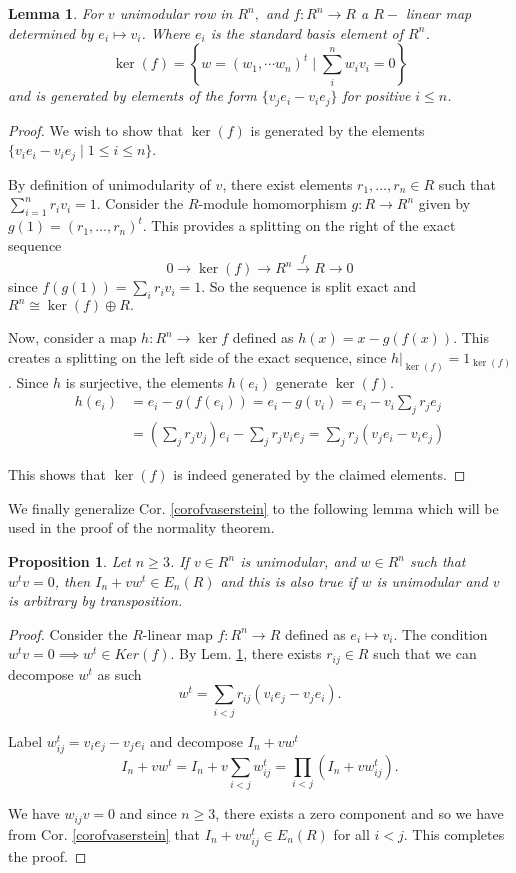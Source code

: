 \documentclass[12pt]{article}
\numberwithin{equation}{section}
\newcounter{dummy} \numberwithin{dummy}{section}
\newtheorem{lemma}[dummy]{Lemma}
\newtheorem{proposition}[dummy]{Proposition}
\begin{document}
		\begin{lemma}\label{kernelf}
			For $v$ unimodular row in $R^n,$ and $f: R^n \to R$ a $R-$ linear map determined by $e_i \mapsto v_i $. Where $e_i $ is the standard basis element of $R^n$.
			\[ \ker (f) =\left\{w=(w_1,\cdots w_n)^t \mid \sum_i^n w_i v_i =0\right\} \] and is generated by elements of the form \( \{ v_j e_i - v_i e_j \} \) for positive $i \leq n$.
			\end{lemma}
		\begin{proof}
			We wish to show that $\ker(f)$ is generated by the elements $\{v_ie_i - v_ie_j \mid 1 \leq i \leq n\}$.
			
			By definition of unimodularity of $v$, there exist elements $r_1, \ldots, r_n \in R$ such that $\sum_{i=1}^n r_iv_i = 1$. Consider the 
			$R$-module homomorphism $g: R \to R^n$ given by $g(1) = (r_1, \ldots, r_n)^t$. This provides a splitting 
			on the right of the exact sequence \[ 0 \to \ker (f ) \to R^n \xrightarrow{f} R \to 0 \] since $f(g(1))=\sum_i r_iv_i = 1$. So the sequence is split exact and $R^n \cong \ker (f) \oplus R.$
			
			Now, consider a map $h:R^n \to \ker f$ defined as  $h(x)=x - g(f(x))$. This creates a splitting on the left side of the 
			exact sequence, since  $h|_{\ker(f)} = 1_{\ker(f)}$. Since $h$ is surjective, the 
			elements $h(e_i)$ generate $\ker(f)$.
			\begin{align*}
				h(e_i) &= e_i - g(f(e_i)) = e_i - g(v_i) = e_i - v_i \sum_j r_je_j\\
				&= (\sum_j r_jv_j)e_i - \sum_j r_jv_ie_j = \sum_j r_j(v_je_i - v_ie_j)
			\end{align*}
			
			This shows that $\ker(f)$ is indeed generated by the claimed elements.
		\end{proof}
		
		We finally generalize Cor. \ref{corofvaserstein} to the following lemma which will be used in the proof of the normality theorem.
		\begin{proposition}\label{finalpropfornormality}
			Let $n \geq 3$. If $v \in R^n$ is unimodular, and $w \in R^n$ such that $w^tv = 0$, then $I_n + vw^t \in E_n(R)$ and this is also true if $w$ is unimodular and $v$ is arbitrary by transposition.
		\end{proposition}
		
		\begin{proof}
			Consider the $R$-linear map $f:R^n \to R$ defined as $e_i \mapsto v_i$. The condition $w^tv = 0 \implies w^t \in Ker(f)$. By Lem. \ref{kernelf}, there exists $r_{ij} \in R$ such that we can decompose $w^t$ as such
			\[
			w^t = \sum_{i<j} r_{ij}(v_ie_j - v_je_i).
			\]
			
			Label $w_{ij}^t = v_ie_j - v_je_i$ and decompose $I_n+vw^t$ 
			\[
			I_n + vw^t = I_n + v\sum_{i<j} w_{ij}^t = \prod_{i<j}(I_n + vw_{ij}^t).
			\]
			
			We have $w_{ij}v=0$ and since $n \geq 3$, there exists a zero component and so we have from Cor. \ref{corofvaserstein} that $I_n + vw_{ij}^t \in E_n(R)$ for all $i < j$. This completes the proof.
		\end{proof}
	
\end{document}
